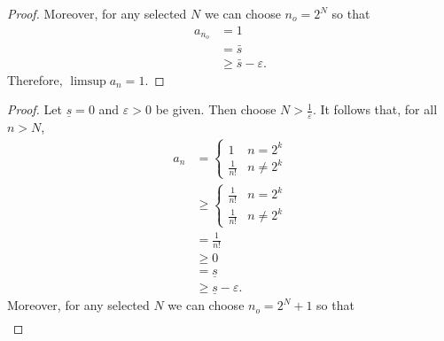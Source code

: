 \documentclass{article}
\begin{document}
\begin{enumerate}
\begin{enumerate}
\begin{proof}
                              Moreover, for any selected $N$ we can choose
                              $n_o=2^N$ so that
                              \begin{align*}
                                    a_{n_o} & = 1                        \\
                                            & = \bar s                   \\
                                            & \geq \bar s - \varepsilon.
                              \end{align*}
                              Therefore, $\limsup a_n=1$.
                        \end{proof}
                        \begin{proof}
                              Let $\underline{s}=0$ and $\varepsilon>0$ be given.
                              Then choose $N>\frac{1}{\varepsilon}$.
                              It follows that, for all $n>N$,
                              \begin{align*}
                                    a_n & = \begin{cases}
                                          1            & n=2^k      \\
                                          \frac{1}{n!} & n \neq 2^k
                                    \end{cases}     \\
                                        & \geq \begin{cases}
                                          \frac{1}{n!} & n=2^k      \\
                                          \frac{1}{n!} & n \neq 2^k
                                    \end{cases}  \\
                                        & = \frac{1}{n!}                  \\
                                        & \geq 0                          \\
                                        & = \underline{s}                 \\
                                        & \geq \underline{s}-\varepsilon.
                              \end{align*}
                              Moreover, for any selected $N$ we can choose
                              $n_o=2^N+1$ so that
                              \begin{align*}

\end{align*}
\end{proof}
\end{enumerate}
\end{enumerate}
\end{document}
